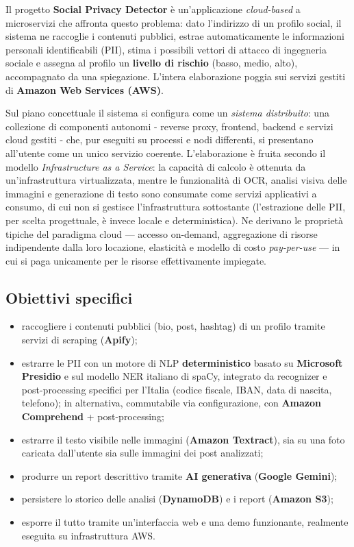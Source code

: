 \documentclass[11pt,a4paper]{article}
\begin{document}
Il progetto \textbf{Social Privacy Detector} è un'applicazione \emph{cloud-based} a
microservizi che affronta questo problema: dato l'indirizzo di un profilo social,
il sistema ne raccoglie i contenuti pubblici, estrae automaticamente le informazioni
personali identificabili (PII), stima i possibili vettori di attacco di ingegneria
sociale e assegna al profilo un \textbf{livello di rischio} (basso, medio, alto),
accompagnato da una spiegazione. L'intera elaborazione poggia sui servizi gestiti di
\textbf{Amazon Web Services (AWS)}.

Sul piano concettuale il sistema si configura come un \emph{sistema distribuito}: una
collezione di componenti autonomi - reverse proxy, frontend, backend e servizi
cloud gestiti - che, pur eseguiti su processi e nodi differenti, si presentano
all'utente come un unico servizio coerente. L'elaborazione è fruita secondo il modello
\emph{Infrastructure as a Service}: la capacità di calcolo è ottenuta da un'infrastruttura
virtualizzata, mentre le funzionalità di
OCR, analisi visiva delle immagini e generazione di testo sono consumate come
servizi applicativi a consumo, di cui non si gestisce l'infrastruttura sottostante
(l'estrazione delle PII, per scelta progettuale, è invece locale e deterministica). Ne
derivano le proprietà tipiche del paradigma cloud --- accesso on-demand, aggregazione
di risorse indipendente dalla loro locazione, elasticità e modello di costo
\emph{pay-per-use} --- in cui si paga unicamente per le risorse effettivamente
impiegate.

\subsection{Obiettivi specifici}
\begin{itemize}[nosep]
  \item raccogliere i contenuti pubblici (bio, post, hashtag) di un profilo tramite
        servizi di scraping (\textbf{Apify});
  \item estrarre le PII con un motore di NLP \textbf{deterministico} basato su
        \textbf{Microsoft Presidio} e sul modello NER italiano di spaCy, integrato da
        recognizer e post-processing specifici per l'Italia (codice fiscale, IBAN, data
        di nascita, telefono); in alternativa, commutabile via configurazione, con
        \textbf{Amazon Comprehend} + post-processing;
  \item estrarre il testo visibile nelle immagini (\textbf{Amazon Textract}), sia su
        una foto caricata dall'utente sia sulle immagini dei post analizzati;
  \item produrre un report descrittivo tramite \textbf{AI generativa}
        (\textbf{Google Gemini});
  \item persistere lo storico delle analisi (\textbf{DynamoDB}) e i report
        (\textbf{Amazon S3});
  \item esporre il tutto tramite un'interfaccia web e una demo funzionante,
        realmente eseguita su infrastruttura AWS.
\end{itemize}
\end{document}
